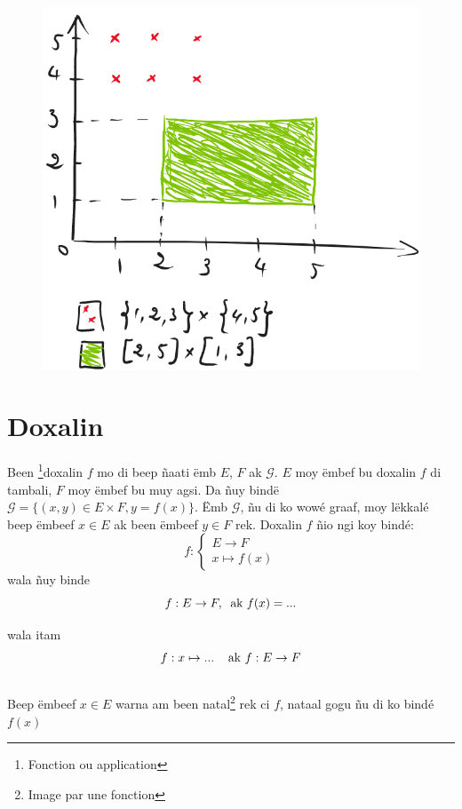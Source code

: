 \documentclass[twoside, a4paper]{article}
\begin{document}
\begin{figure}[ht]
  \centering
  \includegraphics[scale = 0.5]{image/full_carteseng.png}
  \label{fig:full_carteseng}
\end{figure}


\section{Doxalin}
\begin{tcolorbox}[enhanced jigsaw,breakable,pad at break*=1mm, colback=red!5!white,colframe=white!75!black,title= Téeki,
    watermark color=white]
  Been \footnote{Fonction ou application}doxalin $f$ mo di beep ñaati ëmb $E$, $F$ ak $\mathcal{G}$. $E$ moy ëmbef bu doxalin $f$ di tambali, $F$ moy ëmbef bu muy agsi.
  Da ñuy bindë $\mathcal{G} = \big\{ (x,y) \in E\times F, y = f(x)\big\}$.
  Ëmb $\mathcal{G}$, ñu di ko wowé graaf, moy lëkkalé beep ëmbeef $x\in E$ ak been ëmbeef $y\in F$ rek. Doxalin $f$ ñio ngi koy bindé: $$f: \left\{
    \begin{array}{ll}
      E \rightarrow{} F \\
      x \mapsto f(x)
    \end{array}
    \right.$$
  wala ñuy binde $$f: E \rightarrow F, \hspace{0.2cm}\text{ak } f(x) = ...$$

  wala itam $$f: x\mapsto ... \hspace{0.2cm} \hspace{0.2cm} \text{ak } f: E \rightarrow F$$\\
  Beep ëmbeef $x\in E$ warna am been natal\footnote{Image par une fonction} rek ci $f$, nataal gogu  ñu di ko bindé $f(x)$
\end{tcolorbox}
\end{document}
